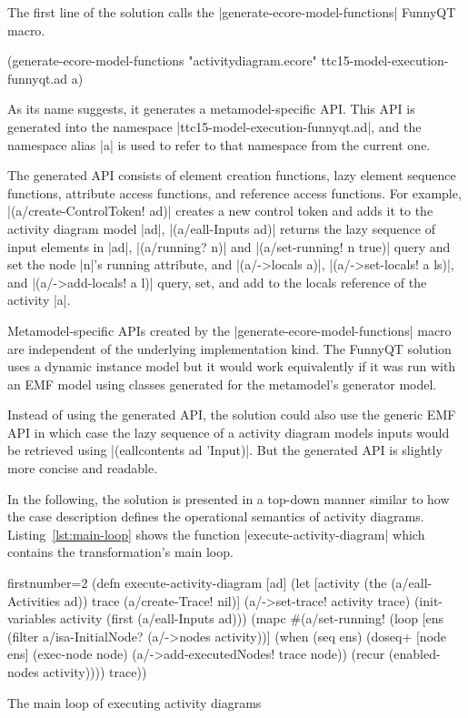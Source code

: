 \documentclass[submission]{eptcs}
\newcommand{\code}{\clojureinline}
\begin{document}
The first line of the solution calls the \code|generate-ecore-model-functions|
FunnyQT macro.

\begin{clojurecode}
(generate-ecore-model-functions "activitydiagram.ecore" ttc15-model-execution-funnyqt.ad a)
\end{clojurecode}

As its name suggests, it generates a metamodel-specific API.  This API is
generated into the namespace \code|ttc15-model-execution-funnyqt.ad|, and the
namespace alias \code|a| is used to refer to that namespace from the current
one.

The generated API consists of element creation functions, lazy element sequence
functions, attribute access functions, and reference access functions.  For
example, \code|(a/create-ControlToken! ad)| creates a new control token and
adds it to the activity diagram model \code|ad|, \code|(a/eall-Inputs ad)|
returns the lazy sequence of input elements in \code|ad|, \code|(a/running? n)|
and \code|(a/set-running! n true)| query and set the node \code|n|'s
\textsf{running} attribute, and \code|(a/->locals a)|, \code|(a/->set-locals! a
ls)|, and \code|(a/->add-locals! a l)| query, set, and add to the
\textsf{locals} reference of the activity \code|a|.

Metamodel-specific APIs created by the \code|generate-ecore-model-functions|
macro are independent of the underlying implementation kind.  The FunnyQT
solution uses a dynamic instance model but it would work equivalently if it was
run with an EMF model using classes generated for the metamodel's generator
model.

Instead of using the generated API, the solution could also use the generic EMF
API in which case the lazy sequence of a activity diagram models inputs would
be retrieved using \code|(eallcontents ad 'Input)|.  But the generated API is
slightly more concise and readable.

\bigskip{}

In the following, the solution is presented in a top-down manner similar to how
the case description defines the operational semantics of activity diagrams.
Listing~\vref{lst:main-loop} shows the function \code|execute-activity-diagram|
which contains the transformation's main loop.

\begin{listing}[h!tb]
\begin{clojurecode*}{firstnumber=2}
(defn execute-activity-diagram [ad]
  (let [activity (the (a/eall-Activities ad))
        trace (a/create-Trace! nil)]
    (a/->set-trace! activity trace)
    (init-variables activity (first (a/eall-Inputs ad)))
    (mapc #(a/set-running! %
    (loop [ens (filter a/isa-InitialNode? (a/->nodes activity))]
      (when (seq ens)
        (doseq+ [node ens]
          (exec-node node)
          (a/->add-executedNodes! trace node))
        (recur (enabled-nodes activity))))
    trace))
\end{clojurecode*}
\caption{The main loop of executing activity diagrams}
\label{lst:main-loop}
\end{listing}
\end{document}
